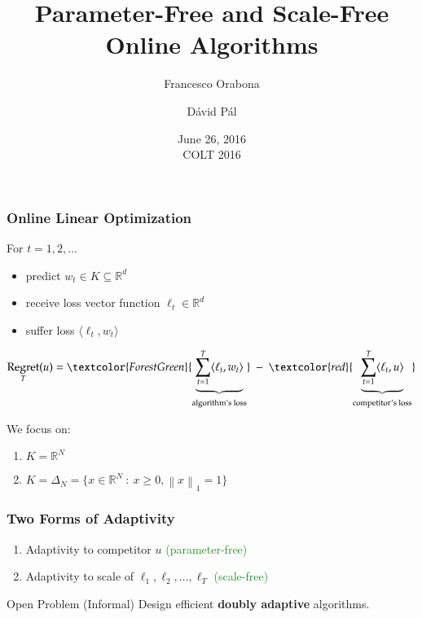 \documentclass[usenames,dvipsnames]{beamer}
\title{Parameter-Free and Scale-Free \\ Online Algorithms}
\date{June 26, 2016 \\ \tiny COLT 2016}
\author{Francesco Orabona \and D\'avid P\'al}
\institute{Yahoo Research, New York}
\DeclareMathOperator{\Regret}{Regret}
\newcommand{\R}{\mathbb{R}}
\newcommand{\norm}[1]{\left\|#1\right\|}
\begin{document}
\begin{frame}
\maketitle
\end{frame}

\begin{frame}
\frametitle{Online Linear Optimization}

For $t=1,2,\dots$
\begin{itemize}
\item predict $w_t \in K \subseteq \R^d$
\item receive loss vector function $\ell_t \in \R^d$
\item suffer loss $\langle \ell_t, w_t \rangle$
\end{itemize}

\vspace{0.5cm}
$$
\Regret_T(u) = \textcolor{ForestGreen}{\underbrace{\sum_{t=1}^T \langle \ell_t, w_t \rangle}_{\text{algorithm's loss}}} \ - \ \textcolor{red}{\underbrace{\sum_{t=1}^T \langle \ell_t, u \rangle}_{\text{competitor's loss}}}
$$

\vspace{0.5cm}

We focus on:
\begin{enumerate}
\item $K = \R^N$
\item $K = \Delta_N = \{ x \in \R^N ~:~ x \ge 0, \norm{x}_1 = 1 \}$
\end{enumerate}

\end{frame}

\begin{frame}
\frametitle{Two Forms of Adaptivity}

\begin{enumerate}
\item Adaptivity to competitor $u$ \qquad \qquad \textcolor{ForestGreen}{(parameter-free)}
\item Adaptivity to scale of $\ell_1, \ell_2, \dots, \ell_T$ \qquad \qquad \textcolor{ForestGreen}{(scale-free)}
\end{enumerate}

\vspace{1cm}

\begin{block}{Open Problem (Informal)}
Design efficient \textbf{doubly adaptive} algorithms.
\end{block}

\end{frame}
\end{document}
